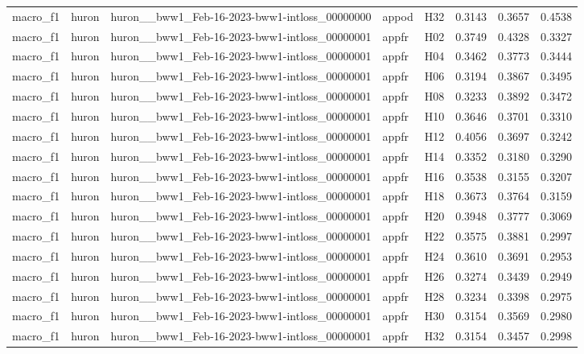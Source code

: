\begin{table}[tbp]
\begin{tabular}{lllllrrr}
macro\_f1 & huron & huron\_\_bww1\_Feb-16-2023-bww1-intloss\_00000000 & appod & H32 & 0.3143 & 0.3657 & 0.4538 \\
macro\_f1 & huron & huron\_\_bww1\_Feb-16-2023-bww1-intloss\_00000001 & appfr & H02 & 0.3749 & 0.4328 & 0.3327 \\
macro\_f1 & huron & huron\_\_bww1\_Feb-16-2023-bww1-intloss\_00000001 & appfr & H04 & 0.3462 & 0.3773 & 0.3444 \\
macro\_f1 & huron & huron\_\_bww1\_Feb-16-2023-bww1-intloss\_00000001 & appfr & H06 & 0.3194 & 0.3867 & 0.3495 \\
macro\_f1 & huron & huron\_\_bww1\_Feb-16-2023-bww1-intloss\_00000001 & appfr & H08 & 0.3233 & 0.3892 & 0.3472 \\
macro\_f1 & huron & huron\_\_bww1\_Feb-16-2023-bww1-intloss\_00000001 & appfr & H10 & 0.3646 & 0.3701 & 0.3310 \\
macro\_f1 & huron & huron\_\_bww1\_Feb-16-2023-bww1-intloss\_00000001 & appfr & H12 & 0.4056 & 0.3697 & 0.3242 \\
macro\_f1 & huron & huron\_\_bww1\_Feb-16-2023-bww1-intloss\_00000001 & appfr & H14 & 0.3352 & 0.3180 & 0.3290 \\
macro\_f1 & huron & huron\_\_bww1\_Feb-16-2023-bww1-intloss\_00000001 & appfr & H16 & 0.3538 & 0.3155 & 0.3207 \\
macro\_f1 & huron & huron\_\_bww1\_Feb-16-2023-bww1-intloss\_00000001 & appfr & H18 & 0.3673 & 0.3764 & 0.3159 \\
macro\_f1 & huron & huron\_\_bww1\_Feb-16-2023-bww1-intloss\_00000001 & appfr & H20 & 0.3948 & 0.3777 & 0.3069 \\
macro\_f1 & huron & huron\_\_bww1\_Feb-16-2023-bww1-intloss\_00000001 & appfr & H22 & 0.3575 & 0.3881 & 0.2997 \\
macro\_f1 & huron & huron\_\_bww1\_Feb-16-2023-bww1-intloss\_00000001 & appfr & H24 & 0.3610 & 0.3691 & 0.2953 \\
macro\_f1 & huron & huron\_\_bww1\_Feb-16-2023-bww1-intloss\_00000001 & appfr & H26 & 0.3274 & 0.3439 & 0.2949 \\
macro\_f1 & huron & huron\_\_bww1\_Feb-16-2023-bww1-intloss\_00000001 & appfr & H28 & 0.3234 & 0.3398 & 0.2975 \\
macro\_f1 & huron & huron\_\_bww1\_Feb-16-2023-bww1-intloss\_00000001 & appfr & H30 & 0.3154 & 0.3569 & 0.2980 \\
macro\_f1 & huron & huron\_\_bww1\_Feb-16-2023-bww1-intloss\_00000001 & appfr & H32 & 0.3154 & 0.3457 & 0.2998 \\

\end{tabular}
\end{table}
